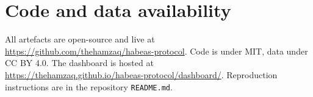 \documentclass[11pt,letterpaper]{article}
\begin{document}
\section*{Code and data availability}

All artefacts are open-source and live at \\
\url{https://github.com/thehamzaq/habeas-protocol}. Code is under MIT, data under CC BY 4.0. The dashboard is hosted at \\
\url{https://thehamzaq.github.io/habeas-protocol/dashboard/}. Reproduction instructions are in the repository \texttt{README.md}.

\end{document}

